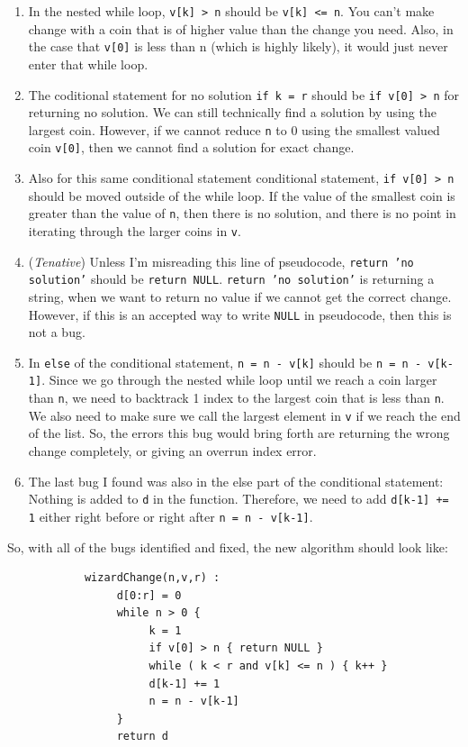 \documentclass[12pt]{article}
\begin{document}
\begin{enumerate}
\begin{enumerate}
{\begin{enumerate}
			\item In the nested while loop, \texttt{v[k] > n} should be \texttt{v[k] <= n}. You can't make change with a coin that is of higher value than the change you need. Also, in the case that \texttt{v[0]} is less than n (which is highly likely), it would just never enter that while loop.

			\item The coditional statement for no solution \texttt{if k = r} should be \texttt{if v[0] > n} for returning no solution. We can still technically find a solution by using the largest coin. However, if we cannot reduce \texttt{n} to 0 using the smallest valued coin \texttt{v[0]}, then we cannot find a solution for exact change.

			\item Also for this same conditional statement conditional statement, \texttt{if v[0] > n} should be moved outside of the while loop. If the value of the smallest coin is greater than the value of \texttt{n}, then there is no solution, and there is no point in iterating through the larger coins in \texttt{v}.

			\item (\emph{Tenative}) Unless I'm misreading this line of pseudocode, \texttt{return 'no solution'} should be \texttt{return NULL}. \texttt{return 'no solution'} is returning a string, when we want to return no value if we cannot get the correct change. However, if this is an accepted way to write \texttt{NULL} in pseudocode, then this is not a bug.

			\item In \texttt{else} of the conditional statement, \texttt{n = n - v[k]} should be \texttt{n = n - v[k-1]}. Since we go through the nested while loop until we reach a coin larger than \texttt{n}, we need to backtrack 1 index to the largest coin that is less than \texttt{n}. We also need to make sure we call the largest element in \texttt{v} if we reach the end of the list. So, the errors this bug would bring forth are returning the wrong change completely, or giving an overrun index error.

			\item The last bug I found was also in the else part of the conditional statement: Nothing is added to \texttt{d} in the function. Therefore, we need to add \texttt{d[k-1] += 1} either right before or right after \texttt{n = n - v[k-1]}.
		\end{enumerate}

		So, with all of the bugs identified and fixed, the new algorithm should look like:
		\begin{small}
		\begin{verbatim}
			wizardChange(n,v,r) :
			     d[0:r] = 0
			     while n > 0 {
			          k = 1
			          if v[0] > n { return NULL }
			          while ( k < r and v[k] <= n ) { k++ }
			          d[k-1] += 1
			          n = n - v[k-1]
			     }
			     return d
		\end{verbatim}
		\end{small}
	}



\end{enumerate}
\end{enumerate}
\end{document}
